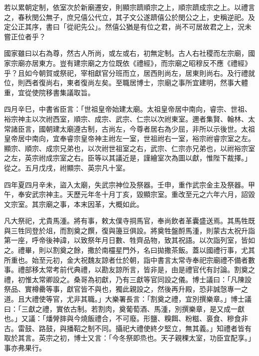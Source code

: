 \begin{pinyinscope}
 若以累朝定制，依室次於新廟遷安，則顯宗躋順宗之上，順宗躋成宗之上。以禮言之，春秋閔公無子，庶兄僖公代立，其子文公遂躋僖公於閔公之上，史稱逆祀。及定公正其序，書曰「從祀先公」。然僖公猶是有位之君，尚不可居故君之上，況未嘗正位者乎？



 國家雖曰以右為尊，然古人所尚，或左或右，初無定制。古人右社稷而左宗廟，國家宗廟亦居東方。豈有建宗廟之方位既依《禮經》，而宗廟之昭穆反不應《禮經》乎？且如今朝賀或祭祀，宰相獻官分班而立，居西則尚左，居東則尚右。及行禮就位，則西者復尚右，東者復尚左矣。至職居博士，宗廟之事所宜建明，然事大體重，宜從使院移書集議取旨。



 四月辛巳，中書省臣言：「世祖皇帝始建太廟。太祖皇帝居中南向，睿宗、世祖、裕宗神主以次祔西室，順宗、成宗、武宗、仁宗以次祔東室。邇者集賢、翰林、太常諸臣言，國朝建太廟遵古制，古尚左，今尊者居右為少屈，非所以示後世。太祖皇帝居中南向，宜奉睿宗皇帝神主祔左一室，世祖祔右一室，裕宗祔睿宗室之左。顯宗、順宗、成宗兄弟也，以次祔世祖室之右，武宗、仁宗亦兄弟也，以祔裕宗室之左，英宗祔成宗室之右。臣等以其議近是，謹繪室次為圖以獻，惟陛下裁擇。」從之。五月戊戌，祔顯宗、英宗凡十室。



 四年夏四月辛未，盜入太廟，失武宗神位及祭器。壬申，重作武宗金主及祭器。甲午，奉安武宗神主。天歷元年冬十月丁亥，毀顯宗室。重改至元之六年六月，詔毀文宗室。其宗廟之事，本末因革，大概如此。



 凡大祭祀，尤貴馬湩。將有事，敕太僕寺挏馬官，奉尚飲者革囊盛送焉。其馬牲既與三牲同登於俎，而割奠之饌，復與籩豆俱設。將奠牲盤酹馬湩，則蒙古太祝升詣第一座，呼帝後神諱，以致祭年月日數、牲齊品物，致其祝語。以次詣列室，皆如之。禮畢，則以割奠之餘，撒於南欞星門外，名曰拋撒茶飯。蓋以國禮行事，尤其所重也。始至元初，金大祝魏友諒者仕於朝，詣中書言太常寺奉祀宗廟禮不備者數事。禮部移太常考前代典禮，以勘友諒所言，皆非是，由是禮官代有討論。割奠之禮，初惟太常卿設之。桑哥為初獻，乃有三獻等官同設之儀。博士議曰：「凡陳設祭品、實樽罍等事，獻官皆不與也，獨此親設之，然後再升殿，恐非誠愨專一之道。且大禮使等官，尤非其職。」大樂署長言：「割奠之禮，宜別撰樂章。」博士議曰：「三獻之禮，實依古制。若割肉，奠葡萄酒、馬湩，別撰樂章，是又成一獻也。」又議：「燔膋膟與今燒飯禮合，不可廢。形鹽、糗餌、粉糍、裛食、糝食非古。雷鼓、路鼓，與播鞀之制不同。攝祀大禮使終夕堅立，無其義。」知禮者皆有取於其言。英宗之初，博士又言：「今冬祭即烝也。天子親稞太室，功臣宜配享。」事亦弗果行。




\end{pinyinscope}
